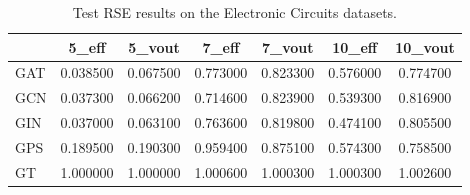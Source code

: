 \begin{table}
\caption{Test RSE results on the Electronic Circuits datasets.}
\label{tab:selected_model_results}
\begin{tabular}{lcccccc}
\toprule
 & 5_eff & 5_vout & 7_eff & 7_vout & 10_eff & 10_vout \\
\midrule
GAT & 0.038500 & 0.067500 & 0.773000 & 0.823300 & 0.576000 & 0.774700 \\
GCN & 0.037300 & 0.066200 & 0.714600 & 0.823900 & 0.539300 & 0.816900 \\
GIN & 0.037000 & 0.063100 & 0.763600 & 0.819800 & 0.474100 & 0.805500 \\
GPS & 0.189500 & 0.190300 & 0.959400 & 0.875100 & 0.574300 & 0.758500 \\
GT & 1.000000 & 1.000000 & 1.000600 & 1.000300 & 1.000300 & 1.002600 \\
\bottomrule
\end{tabular}
\end{table}
